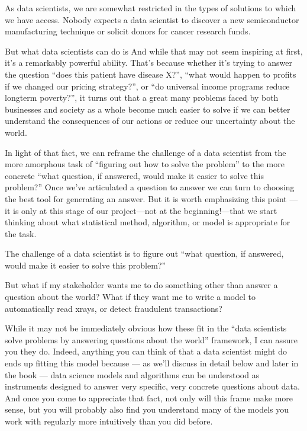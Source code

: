 \documentclass[letterpaper,10pt,english]{jupyterBook}
\begin{document}
\sphinxAtStartPar
As data scientists, we are somewhat restricted in the types of solutions to which we have access. Nobody expects a data scientist to discover a new semiconductor manufacturing technique or solicit donors for cancer research funds.

\sphinxAtStartPar
But what data scientists can do is  And while that may not seem inspiring at first, it’s a remarkably powerful ability. That’s because whether it’s trying to answer the question “does this patient have disease X?”, “what would happen to profits if we changed our pricing strategy?”, or “do universal income programs reduce long\sphinxhyphen{}term poverty?”, it turns out that a great many problems faced by both businesses and society as a whole become much easier to solve if we can better understand the consequences of our actions or reduce our uncertainty about the world.

\sphinxAtStartPar
In light of that fact, we can reframe the challenge of a data scientist from the more amorphous task of “figuring out how to solve the problem” to the more concrete “what question, if answered, would make it easier to solve this problem?” Once we’ve articulated a question to answer we can turn to choosing the best tool for generating an answer. But it is worth emphasizing this point — it is only at this stage of our project—not at the beginning!—that we start thinking about what statistical method, algorithm, or model is appropriate for the task.

\begin{sphinxShadowBox}

\sphinxAtStartPar
The challenge of a data scientist is to figure out “what question, if answered, would make it easier to solve this problem?”
\end{sphinxShadowBox}

\sphinxAtStartPar
But what if my stakeholder wants me to do something other than answer a question about the world? What if they want me to write a model to automatically read x\sphinxhyphen{}rays, or detect fraudulent transactions?

\sphinxAtStartPar
While it may not be immediately obvious how these fit in the “data scientists solve problems by answering questions about the world” framework, I can assure you they do. Indeed, anything you can think of that a data scientist might do ends up fitting this model because — as we’ll discuss in detail below and later in the book —  data science models and algorithms can be understood as instruments designed to answer very specific, very concrete questions about data. And once you come to appreciate that fact, not only will this frame make more sense, but you will probably also find you understand many of the models you work with regularly more intuitively than you did before.
\end{document}

